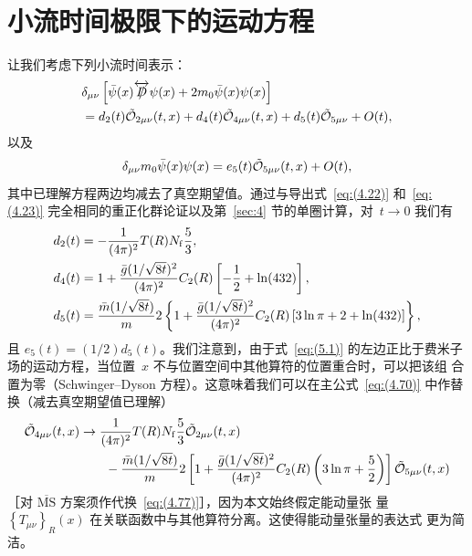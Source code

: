 \section{小流时间极限下的运动方程}
\label{sec:5}
让我们考虑下列小流时间表示：
\begin{align}
   &\delta_{\mu\nu}\left[\Bar{\psi}(x)\overleftrightarrow{\Slash{D}}\psi(x)
   +2m_0\Bar{\psi}(x)\psi(x)\right]
\notag\\
   &=d_2(t)\Tilde{\mathcal{O}}_{2\mu\nu}(t,x)
   +d_4(t)\Tilde{\mathcal{O}}_{4\mu\nu}(t,x)
   +d_5(t)\Tilde{\mathcal{O}}_{5\mu\nu}+O(t),
\label{eq:(5.1)}
\end{align}
以及
\begin{equation}
   \delta_{\mu\nu}m_0\Bar{\psi}(x)\psi(x)
   =e_5(t)\Tilde{\mathcal{O}}_{5\mu\nu}(t,x)+O(t),
\label{eq:(5.2)}
\end{equation}
其中已理解方程两边均减去了真空期望值。通过与导出式~\eqref{eq:(4.22)}
和~\eqref{eq:(4.23)} 完全相同的重正化群论证以及第~\ref{sec:4} 节的单圈计算，对~$t\to0$
我们有
\begin{align}
   d_2(t)&=-\frac{1}{(4\pi)^2}T(R)N_{\mathrm{f}}\frac{5}{3},
\label{eq:(5.3)}\\
   d_4(t)&=1+\frac{\Bar{g}(1/\sqrt{8t})^2}{(4\pi)^2}C_2(R)
   \left[-\frac{1}{2}+\ln(432)\right],
\label{eq:(5.4)}\\
   d_5(t)&=\frac{\Bar{m}(1/\sqrt{8t})}{m}
   2\left\{1+\frac{\Bar{g}(1/\sqrt{8t})^2}{(4\pi)^2}C_2(R)
   \left[3\ln\pi+2+\ln(432)\right]\right\},
\label{eq:(5.5)}
\end{align}
且 $e_5(t)=(1/2)d_5(t)$。我们注意到，由于式~\eqref{eq:(5.1)}
的左边正比于费米子场的运动方程，当位置~$x$ 不与位置空间中其他算符的位置重合时，可以把该组
合置为零（Schwinger--Dyson 方程）。这意味着我们可以在主公式~\eqref{eq:(4.70)}
中作替换（减去真空期望值已理解）
\begin{align}
   \Tilde{\mathcal{O}}_{4\mu\nu}(t,x)
   &\to\frac{1}{(4\pi)^2}T(R)N_{\mathrm{f}}\frac{5}{3}
   \Tilde{\mathcal{O}}_{2\mu\nu}(t,x)
\notag\\
   &\qquad{}
   -\frac{\Bar{m}(1/\sqrt{8t})}{m}2
   \left[1+\frac{\Bar{g}(1/\sqrt{8t})^2}{(4\pi)^2}C_2(R)
   \left(3\ln\pi+\frac{5}{2}\right)\right]\Tilde{\mathcal{O}}_{5\mu\nu}(t,x)
\label{eq:(5.6)}
\end{align}
［对 $\overline{\text{MS}}$ 方案须作代换~\eqref{eq:(4.77)}］，因为本文始终假定能动量张
量~$\left\{T_{\mu\nu}\right\}_R(x)$ 在关联函数中与其他算符分离。这使得能动量张量的表达式
更为简洁。

